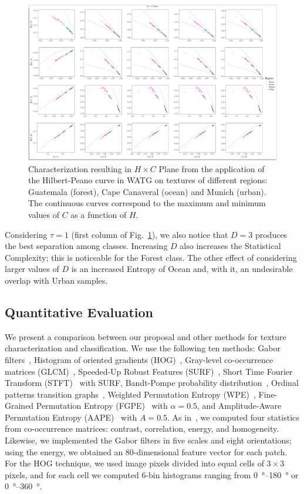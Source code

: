 \documentclass[journal]{IEEEtran}
\begin{document}
\begin{figure}
	\centering
	\includegraphics[width=1\textwidth]{Figures/WATGHC.pdf}
	\caption{Characterization resulting in $H \times C$ Plane from the application of the Hilbert-Peano curve in WATG on textures of different regions: Guatemala (forest), Cape Canaveral (ocean) and Munich (urban). 
	The continuous curves correspond to the maximum and minimum values of $C$ as a function of $H$.}
	\label{fig:Regions}
\end{figure}

Considering $\tau=1$ (first column of Fig.~\ref{fig:Regions}), 
we also notice that $D=3$ produces the best separation among classes.
Increasing $D$ also increases the Statistical Complexity; this is noticeable for the Forest class.
The other effect of considering larger values of $D$ is an increased Entropy of Ocean and, with it, an undesirable overlap with Urban samples.

\subsection{Quantitative Evaluation}

We present a comparison between our proposal and other methods for texture characterization and classification.
We use the following ten methods: 
Gabor filters~\cite{weldon1996efficient},  
Histogram of oriented gradients (HOG)~\cite{dalal2005histograms},
Gray-level co-occurrence matrices (GLCM)~\cite{kourgli2012texture}, 
Speeded-Up Robust Features (SURF)~\cite{bay2006surf},
Short Time Fourier Transform (STFT)~\cite{portnoff1980time} with SURF,
Bandt-Pompe probability distribution~\cite{Bandt2002Permutation}, 
Ordinal patterns transition graphs~\cite{Borges2019Transition},
Weighted Permutation Entropy (WPE)~\cite{Fadlallah2013Weightedpermutation},
Fine-Grained Permutation Entropy (FGPE)~\cite{xiao2009fine} with $\alpha = 0.5$, and
Amplitude-Aware Permutation Entropy (AAPE)~\cite{azami2016amplitude} with $A = 0.5$.
As in~\cite{guan2019covariance}, 
we computed four statistics from co-occurrence matrices: contrast, correlation, energy, and homogeneity.
Likewise, we implemented the Gabor filters in five scales and eight orientations; using the energy, we obtained an $80$-dimensional feature vector for each patch.
For the HOG technique, we used image pixels divided into equal cells of $3 \times 3$ pixels, and for each cell we computed 6-bin histograms ranging from \SIrange{0}{180}{\degree} or \SIrange{0}{360}{\degree}.
\end{document}
